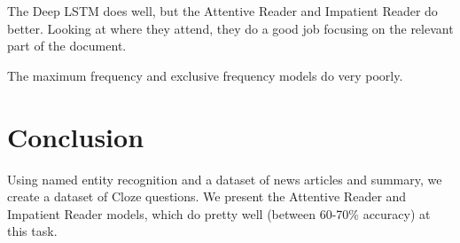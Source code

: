 \documentclass[a4paper]{article}
\begin{document}
The Deep LSTM does well, but the Attentive Reader and Impatient Reader do
better. Looking at where they attend, they do a good job focusing on the
relevant part of the document.

The maximum frequency and exclusive frequency models do very poorly.

\section{Conclusion}
Using named entity recognition and a dataset of news articles and summary, we
create a dataset of Cloze questions. We present the Attentive Reader and
Impatient Reader models, which do pretty well (between 60-70\% accuracy)
at this task.
\end{document}
